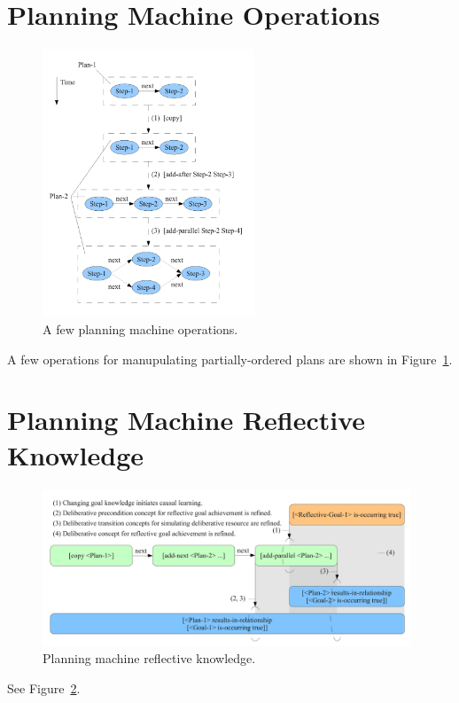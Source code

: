 \section{Planning Machine Operations}

\begin{figure}[bth]
  \center
  \includegraphics[height=8cm]{gfx/planning_machine_operations}
  \caption[A few planning machine operations]{A few planning machine operations.}
  \label{fig:planning_machine_operations}
\end{figure}

A few operations for manupulating partially-ordered plans are shown in
Figure~\ref{fig:planning_machine_operations}.


\section{Planning Machine Reflective Knowledge}

\begin{figure}[bth]
  \center
  \includegraphics[width=11cm]{gfx/planning_machine_reflective_knowledge}
  \caption[Planning machine reflective knowledge]{Planning machine reflective knowledge.}
  \label{fig:planning_machine_reflective_knowledge}
\end{figure}

See Figure~\ref{fig:planning_machine_reflective_knowledge}.


